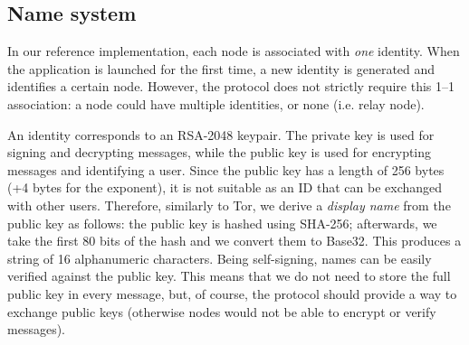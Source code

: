 \documentclass[a4paper,12pt]{article}
\begin{document}
\subsection*{Name system}
In our reference implementation, each node is associated with \emph{one} identity. When the application is launched for the first time, a new identity is generated and identifies a certain node. However, the protocol does not strictly require this 1--1 association: a node could have multiple identities, or none (i.e. relay node).

An identity corresponds to an RSA-2048 keypair. The private key is used for signing and decrypting messages, while the public key is used for encrypting messages and identifying a user. Since the public key has a length of 256 bytes (+4 bytes for the exponent), it is not suitable as an ID that can be exchanged with other users. Therefore, similarly to Tor, we derive a \emph{display name} from the public key as follows: the public key is hashed using SHA-256; afterwards, we take the first 80 bits of the hash and we convert them to Base32. This produces a string of 16 alphanumeric characters. Being self-signing, names can be easily verified against the public key. This means that we do not need to store the full public key in every message, but, of course, the protocol should provide a way to exchange public keys (otherwise nodes would not be able to encrypt or verify messages).
\end{document}
